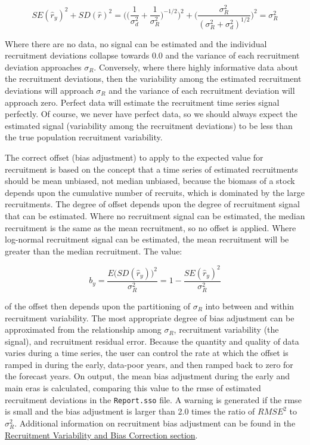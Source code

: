\begin{equation}
SE(\hat{r}_y)^2 + SD(\hat{r})^2=\Bigg( \bigg( \frac{1}{\sigma^2_d}+\frac{1}{\sigma^2_R}\bigg)^{-1/2}\Bigg)^2+\Bigg( \frac{\sigma^2_R}{(\sigma^2_R+\sigma^2_d)^{1/2}}\Bigg)^2=\sigma^2_R
\end{equation}

Where there are no data, no signal can be estimated and the individual recruitment deviations collapse towards 0.0 and the variance of each recruitment deviation approaches $\sigma_R$. Conversely, where there highly informative data about the recruitment deviations, then the variability among the estimated recruitment deviations will approach $\sigma_R$ and the variance of each recruitment deviation will approach zero. Perfect data will estimate the recruitment time series signal perfectly. Of course, we never have perfect data, so we should always expect the estimated signal (variability among the recruitment deviations) to be less than the true population recruitment variability.

The correct offset (bias adjustment) to apply to the expected value for recruitment is based on the concept that a time series of estimated recruitments should be mean unbiased, not median unbiased, because the biomass of a stock depends upon the cumulative number of recruits, which is dominated by the large recruitments. The degree of offset depends upon the degree of recruitment signal that can be estimated. Where no recruitment signal can be estimated, the median recruitment is the same as the mean recruitment, so no offset is applied. Where log-normal recruitment signal can be estimated, the mean recruitment will be greater than the median recruitment. The value:

\begin{equation}
	b_y=\frac{E\Big( SD(\hat{r}_y)\Big)^2}{\sigma^2_R}=1-\frac{SE(\hat{r}_y)^2}{\sigma^2_R}
\end{equation}

\noindent of the offset then depends upon the partitioning of $\sigma_R$ into between and within recruitment variability. The most appropriate degree of bias adjustment can be approximated from the relationship among $\sigma_R$, recruitment variability (the signal), and recruitment residual error. Because the quantity and quality of data varies during a time series, the user can control the rate at which the offset is ramped in during the early, data-poor years, and then ramped back to zero for the forecast years. On output, the mean bias adjustment during the early and main eras is calculated, comparing this value to the \gls{rmse} of estimated recruitment deviations in the \texttt{Report.sso} file. A warning is generated if the \gls{rmse} is small and the bias adjustment is larger than 2.0 times the ratio of $RMSE^2$ to $\sigma^2_R$. Additional information on recruitment bias adjustment can be found in the \hyperlink{BiasCorrect}{Recruitment Variability and Bias Correction section}.

